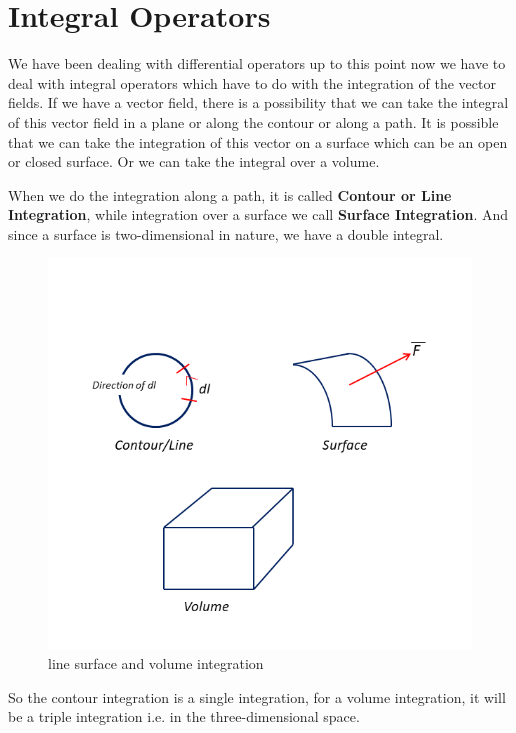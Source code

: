 \section{Integral Operators}

We have been dealing with differential operators up to this point now we have to deal with integral operators which have to do with the integration of the vector fields. If we have a vector field, there is a possibility that we can take the integral of this vector field in a plane or along the contour or along a path. It is possible that we can take the integration of this vector on a surface which can be an open or closed surface. Or we can take the integral over a volume. 

When we do the integration along a path, it is called \textbf{Contour or Line Integration}, while integration over a surface we call \textbf{Surface Integration}. And since a surface is two-dimensional in nature, we have a double integral.

\begin{figure}[h]
\centering
\includegraphics[width=1\linewidth]{./graphics/fig17.3}
\caption{line surface and volume integration}
\end{figure}

So the contour integration is a single integration, for a volume integration, it will be a triple integration i.e. in the three-dimensional space.


